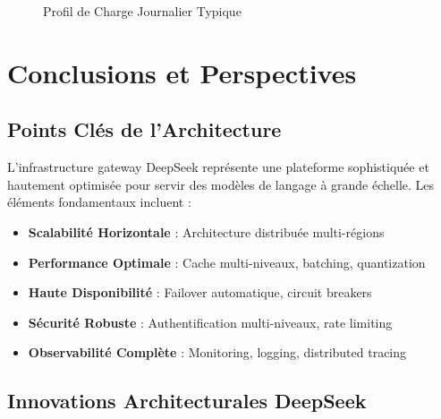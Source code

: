 \documentclass[12pt,a4paper]{article}
\begin{document}
\begin{figure}[h]
\centering
{}
\caption{Profil de Charge Journalier Typique}
\end{figure}

\newpage
\section{Conclusions et Perspectives}

\subsection{Points Clés de l'Architecture}

L'infrastructure gateway DeepSeek représente une plateforme sophistiquée et hautement optimisée pour servir des modèles de langage à grande échelle. Les éléments fondamentaux incluent :

\begin{itemize}[leftmargin=2cm]
    \item \textbf{Scalabilité Horizontale} : Architecture distribuée multi-régions
    \item \textbf{Performance Optimale} : Cache multi-niveaux, batching, quantization
    \item \textbf{Haute Disponibilité} : Failover automatique, circuit breakers
    \item \textbf{Sécurité Robuste} : Authentification multi-niveaux, rate limiting
    \item \textbf{Observabilité Complète} : Monitoring, logging, distributed tracing
\end{itemize}

\subsection{Innovations Architecturales DeepSeek}
\end{document}
